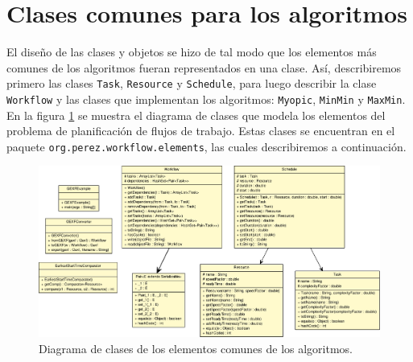 \section{Clases comunes para los algoritmos}
El diseño de las clases y objetos se hizo de tal modo que los elementos más comunes de los algoritmos fueran representados en una clase. Así, describiremos primero las clases \texttt{Task}, \texttt{Resource} y \texttt{Schedule}, para luego describir la clase \texttt{Workflow} y las clases que implementan los algoritmos: \texttt{Myopic}, \texttt{MinMin} y \texttt{MaxMin}. En la figura \ref{fig:uml_class} se muestra el diagrama de clases que modela los elementos del problema de planificación de flujos de trabajo. Estas clases se encuentran en el paquete \texttt{org.perez.workflow.elements}, las cuales describiremos a continuación.

\begin{figure}
\label{fig:uml_class}
\begin{center}
\includegraphics[width=1.2\textwidth,angle=90]{imagenes/elements_uml.pdf}
\end{center}
\caption{Diagrama de clases de los elementos comunes de los algoritmos.}
\end{figure}

